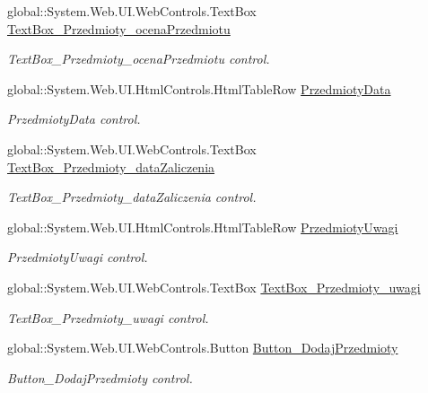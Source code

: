 \begin{DoxyCompactItemize}
global\+::\+System.\+Web.\+U\+I.\+Web\+Controls.\+Text\+Box \hyperlink{class_dziennik_ocen_web2_1_1_web_form1_acd1f8459612e926ade2856e75348ea7c}{Text\+Box\+\_\+\+Przedmioty\+\_\+ocena\+Przedmiotu}
\begin{DoxyCompactList}\small\item\em Text\+Box\+\_\+\+Przedmioty\+\_\+ocena\+Przedmiotu control. \end{DoxyCompactList}\item 
global\+::\+System.\+Web.\+U\+I.\+Html\+Controls.\+Html\+Table\+Row \hyperlink{class_dziennik_ocen_web2_1_1_web_form1_aaf454ed1f421284f7248d2428b442739}{Przedmioty\+Data}
\begin{DoxyCompactList}\small\item\em Przedmioty\+Data control. \end{DoxyCompactList}\item 
global\+::\+System.\+Web.\+U\+I.\+Web\+Controls.\+Text\+Box \hyperlink{class_dziennik_ocen_web2_1_1_web_form1_a53cf39cd0712712d4a869bd5c846aad7}{Text\+Box\+\_\+\+Przedmioty\+\_\+data\+Zaliczenia}
\begin{DoxyCompactList}\small\item\em Text\+Box\+\_\+\+Przedmioty\+\_\+data\+Zaliczenia control. \end{DoxyCompactList}\item 
global\+::\+System.\+Web.\+U\+I.\+Html\+Controls.\+Html\+Table\+Row \hyperlink{class_dziennik_ocen_web2_1_1_web_form1_af38d3b4fdef8737b1b414b0bf6ca6b60}{Przedmioty\+Uwagi}
\begin{DoxyCompactList}\small\item\em Przedmioty\+Uwagi control. \end{DoxyCompactList}\item 
global\+::\+System.\+Web.\+U\+I.\+Web\+Controls.\+Text\+Box \hyperlink{class_dziennik_ocen_web2_1_1_web_form1_ab9368c26118387c8cd81c23f679b2974}{Text\+Box\+\_\+\+Przedmioty\+\_\+uwagi}
\begin{DoxyCompactList}\small\item\em Text\+Box\+\_\+\+Przedmioty\+\_\+uwagi control. \end{DoxyCompactList}\item 
global\+::\+System.\+Web.\+U\+I.\+Web\+Controls.\+Button \hyperlink{class_dziennik_ocen_web2_1_1_web_form1_a71e8b22e9d07253f09658420f9cd762d}{Button\+\_\+\+Dodaj\+Przedmioty}
\begin{DoxyCompactList}\small\item\em Button\+\_\+\+Dodaj\+Przedmioty control. \end{DoxyCompactList}\item 

\end{DoxyCompactItemize}
